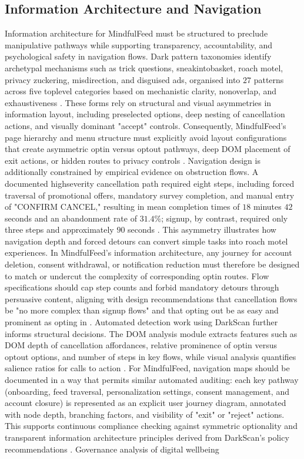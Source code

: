 \documentclass{article}
\begin{document}
\subsection{Information Architecture and Navigation}
\label{sec:info_arch_navigation} Information architecture for MindfulFeed must be structured to preclude manipulative pathways while supporting transparency, accountability, and psychological safety in navigation flows. Dark pattern taxonomies identify archetypal mechanisms such as trick questions, sneak\-into\-basket, roach motel, privacy zuckering, misdirection, and disguised ads, organised into $27$ patterns across five top\-level categories based on mechanistic clarity, non\-overlap, and exhaustiveness \parencites[2]{4807303}. These forms rely on structural and visual asymmetries in information layout, including preselected options, deep nesting of cancellation actions, and visually dominant "accept" controls. Consequently, MindfulFeed's page hierarchy and menu structure must explicitly avoid layout configurations that create asymmetric opt\-in versus opt\-out pathways, deep DOM placement of exit actions, or hidden routes to privacy controls \parencites[2]{4807303}[4]{4807303}. Navigation design is additionally constrained by empirical evidence on obstruction flows. A documented high\-severity cancellation path required eight steps, including forced traversal of promotional offers, mandatory survey completion, and manual entry of "CONFIRM CANCEL," resulting in mean completion times of $18$ minutes $42$ seconds and an abandonment rate of $31.4\%$; sign\-up, by contrast, required only three steps and approximately $90$ seconds \parencites[8]{4807303}. This asymmetry illustrates how navigation depth and forced detours can convert simple tasks into roach motel experiences. In MindfulFeed's information architecture, any journey for account deletion, consent withdrawal, or notification reduction must therefore be designed to match or undercut the complexity of corresponding opt\-in routes. Flow specifications should cap step counts and forbid mandatory detours through persuasive content, aligning with design recommendations that cancellation flows be "no more complex than sign\-up flows" and that opting out be as easy and prominent as opting in \parencites[6]{4807303}[8]{4807303}. Automated detection work using DarkScan further informs structural decisions. The DOM analysis module extracts features such as DOM depth of cancellation affordances, relative prominence of opt\-in versus opt\-out options, and number of steps in key flows, while visual analysis quantifies salience ratios for calls to action \parencites[4]{4807303}. For MindfulFeed, navigation maps should be documented in a way that permits similar automated auditing: each key pathway (onboarding, feed traversal, personalization settings, consent management, and account closure) is represented as an explicit user journey diagram, annotated with node depth, branching factors, and visibility of "exit" or "reject" actions. This supports continuous compliance checking against symmetric optionality and transparent information architecture principles derived from DarkScan's policy recommendations \parencites[6]{4807303}. Governance analysis of digital well\-being 
\end{document}
